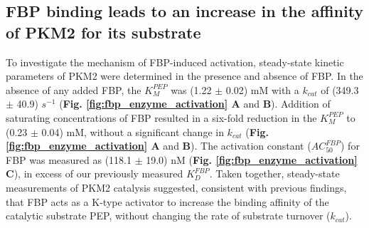 \subsection{FBP binding leads to an increase in the affinity of PKM2 for its substrate}
\label{subsec:pkm2activity_subs_affinity}
To investigate the mechanism of FBP-induced activation, steady-state kinetic parameters of PKM2 were determined in the presence and absence of FBP. In the absence of any added FBP, the $K_{M}^{PEP}$ was (1.22 $\pm$ 0.02) mM with a $k_{cat}$ of (349.3 $\pm$ 40.9) $s^{-1}$ (\textbf{Fig. \ref{fig:fbp_enzyme_activation} A} and \textbf{B}). Addition of saturating concentrations of FBP resulted in a six-fold reduction in the $K_{M}^{PEP}$ to (0.23 $\pm$ 0.04) mM, without a significant change in $k_{cat}$  (\textbf{Fig. \ref{fig:fbp_enzyme_activation} A} and \textbf{B}). The activation constant ($AC_{50}^{FBP}$) for FBP was measured as (118.1 $\pm$ 19.0) nM (\textbf{Fig. \ref{fig:fbp_enzyme_activation} C}), in excess of our previously measured $K_{D}^{FBP}$. Taken together, steady-state measurements of PKM2 catalysis suggested, consistent with previous findings, that FBP acts as a K-type activator to increase the binding affinity of the catalytic substrate PEP, without changing the rate of substrate turnover ($k_{cat}$).
%
%
%

